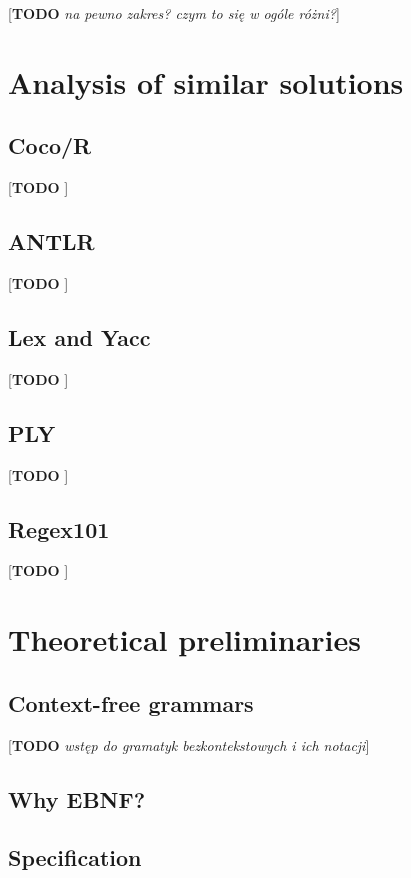 \documentclass[english,engineering]{wizthesis}
\newcommand{\todo}[1]{{\color{red}[\textbf{TODO} \textit{#1}]}}
\begin{document}
\todo{na pewno zakres? czym to się w ogóle różni?}

\chapter{Analysis of similar solutions}

\section{Coco/R}

\todo{\cite{coco/r}}

\section{ANTLR}

\todo{\cite{antlr}}

\section{Lex and Yacc}

\todo{\cite{lex-yacc}}

\section{PLY}

\todo{\cite{ply}}

\section{Regex101}

\todo{\cite{regex101}}

\chapter{Theoretical preliminaries}

\section{Context-free grammars}

\todo{wstęp do gramatyk bezkontekstowych i ich notacji}

\section{Why EBNF?}

\section{Specification}
\end{document}
